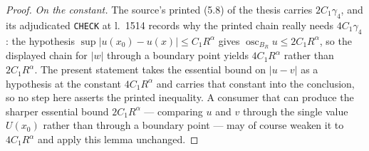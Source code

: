 \begin{proof}
\emph{On the constant.}  The source's printed (5.8) of the thesis carries
$2C_1\gamma_4$, and its adjudicated \texttt{CHECK} at l.~1514 records why the
printed chain really needs $4C_1\gamma_4$: the hypothesis
$\sup|u(x_0)-u(x)|\le C_1R^{\alpha}$ gives
$\operatorname*{osc}_{B_R}u\le2C_1R^{\alpha}$, so the displayed chain for $|w|$
through a boundary point yields $4C_1R^{\alpha}$ rather than $2C_1R^{\alpha}$.
The present statement takes the essential bound on $|u-v|$ as a hypothesis at
the constant $4C_1R^{\alpha}$ and carries that constant into the conclusion, so
no step here asserts the printed inequality.  A consumer that can produce the
sharper essential bound $2C_1R^{\alpha}$ --- comparing $u$ and $v$ through the
single value $U(x_0)$ rather than through a boundary point --- may of course
weaken it to $4C_1R^{\alpha}$ and apply this lemma unchanged.
\end{proof}
